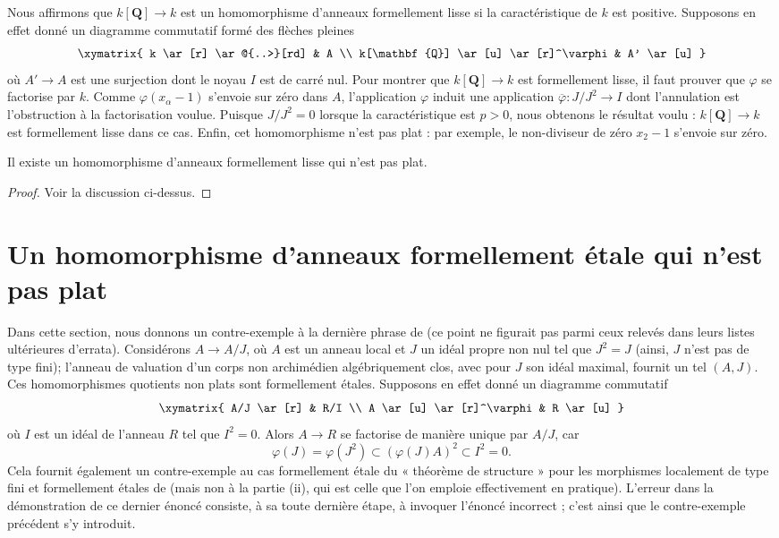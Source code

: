 \medskip\noindent
Nous affirmons que $k[\mathbf{Q}] \to k$ est un homomorphisme d'anneaux formellement lisse
si la caractéristique de $k$ est positive. Supposons en effet donné un
diagramme commutatif formé des flèches pleines
$$
\xymatrix{
k \ar[r] \ar@{..>}[rd] & A \\
k[\mathbf{Q}] \ar[u] \ar[r]^\varphi & A' \ar[u]
}
$$
où $A' \to A$ est une surjection dont le noyau $I$ est de carré nul.
Pour montrer que $k[\mathbf{Q}] \to k$ est formellement lisse, il faut prouver
que $\varphi$ se factorise par $k$. Comme $\varphi(x_\alpha - 1)$ s'envoie
sur zéro dans $A$, l'application $\varphi$ induit une application
$\overline{\varphi} : J/J^2 \to I$ dont l'annulation est l'obstruction
à la factorisation voulue. Puisque $J/J^2 = 0$ lorsque la caractéristique
est $p > 0$, nous obtenons le résultat voulu : $k[\mathbf{Q}] \to k$ est
formellement lisse dans ce cas. Enfin, cet homomorphisme n'est pas plat :
par exemple, le non-diviseur de zéro $x_2 - 1$ s'envoie sur zéro.

\begin{lemma}
\label{lemma-formally-smooth-nonflat}
Il existe un homomorphisme d'anneaux formellement lisse qui n'est pas plat.
\end{lemma}

\begin{proof}
Voir la discussion ci-dessus.
\end{proof}


\section{Un homomorphisme d'anneaux formellement \'etale qui n'est pas plat}
\label{section-formally-etale-nonflat}

\noindent
Dans cette section, nous donnons un contre-exemple à la dernière phrase de
\cite[0, exemple 19.10.3(i)]{EGA} (ce point ne figurait pas parmi ceux relevés
dans leurs listes ultérieures d'errata). Considérons $A \to A/J$, où $A$ est un anneau local
et $J$ un idéal propre non nul tel que $J^2 = J$ (ainsi, $J$ n'est pas de type
fini); l'anneau de valuation d'un corps non archimédien algébriquement clos,
avec pour $J$ son idéal maximal, fournit un tel $(A, J)$. Ces
homomorphismes quotients non plats sont formellement \'etales. Supposons en effet donné un
diagramme commutatif
$$
\xymatrix{
A/J \ar[r] & R/I \\
A \ar[u] \ar[r]^\varphi & R \ar[u]
}
$$
où $I$ est un idéal de l'anneau $R$ tel que $I^2 = 0$. Alors $A \to R$
se factorise de manière unique par $A/J$, car
$$
\varphi(J) = \varphi(J^2) \subset (\varphi(J)A)^2 \subset I^2 = 0.
$$
Cela fournit également un contre-exemple au cas formellement \'etale
du « théorème de structure » pour les morphismes localement de type fini et formellement \'etales
de \cite[IV, théorème 18.4.6(i)]{EGA}
(mais non à la partie (ii), qui est celle que l'on emploie effectivement
en pratique). L'erreur dans la démonstration de ce dernier énoncé
consiste, à sa toute dernière étape, à invoquer l'énoncé incorrect
\cite[0, exemple 19.3.10(i)]{EGA};
c'est ainsi que le contre-exemple précédent s'y introduit.


